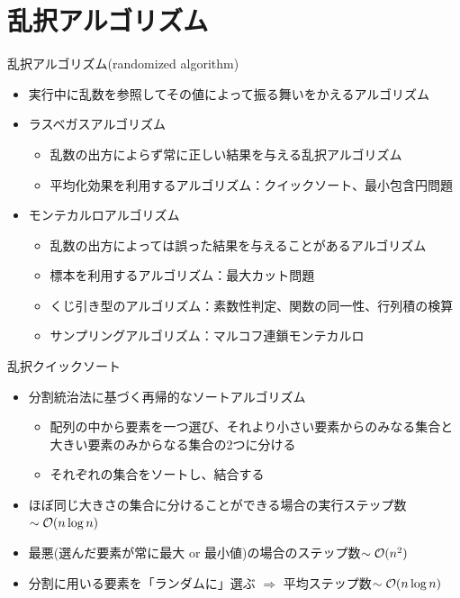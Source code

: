 \section{乱択アルゴリズム}

\begin{frame}[t,fragile]{乱択アルゴリズム(randomized algorithm)}
  \begin{itemize}
  \item 実行中に乱数を参照してその値によって振る舞いをかえるアルゴリズム
  \item ラスベガスアルゴリズム
    \begin{itemize}
    \item 乱数の出方によらず常に正しい結果を与える乱択アルゴリズム
    \item 平均化効果を利用するアルゴリズム：クイックソート、最小包含円問題
    \end{itemize}
  \item モンテカルロアルゴリズム
    \begin{itemize}
    \item 乱数の出方によっては誤った結果を与えることがあるアルゴリズム
    \item 標本を利用するアルゴリズム：最大カット問題
    \item くじ引き型のアルゴリズム：素数性判定、関数の同一性、行列積の検算
    \item サンプリングアルゴリズム：マルコフ連鎖モンテカルロ
    \end{itemize}
  \end{itemize}
\end{frame}

\begin{frame}[t,fragile]{乱択クイックソート}
  \begin{itemize}
    \setlength{\itemsep}{1em}
  \item 分割統治法に基づく再帰的なソートアルゴリズム
    \begin{itemize}
      \item 配列の中から要素を一つ選び、それより小さい要素からのみなる集合と大きい要素のみからなる集合の2つに分ける
      \item それぞれの集合をソートし、結合する
    \end{itemize}
    \item ほぼ同じ大きさの集合に分けることができる場合の実行ステップ数$\sim {\cal O}(n \log n)$
    \item 最悪(選んだ要素が常に最大 or 最小値)の場合のステップ数$\sim {\cal O}(n^2)$
    \item 分割に用いる要素を「ランダムに」選ぶ $\Rightarrow$ 平均ステップ数$\sim {\cal O}(n \log n)$
  \end{itemize}
\end{frame}


